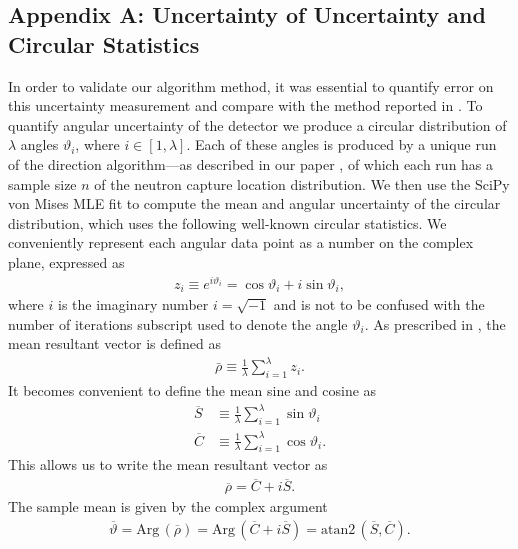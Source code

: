 \documentclass[tightenlines,twocolumn,prl,notitlepage,nofootinbib,preprintnumbers,longbibliography]{revtex4-1}
\begin{document}
\subsection{Appendix A: Uncertainty of Uncertainty and Circular Statistics}\label{app:uncert_of_uncert_and_circularstats}
%
In order to validate our algorithm method, it was essential to quantify error on this uncertainty measurement and compare with the method reported in \cite{Duvall_2022}. To quantify angular uncertainty of the detector we produce a circular distribution of $\lambda$ angles  $\vartheta_i$, where $i\in[1,\lambda]$. Each of these angles is produced by a unique run of the direction algorithm---as described in our paper \cite{10.1063/5.0315079}, of which each run has a sample size $n$ of the neutron capture location distribution. We then use the SciPy von Mises MLE fit to compute the mean and angular uncertainty of the circular distribution, which uses the following well-known circular statistics. We conveniently represent each angular data point as a number on the complex plane, expressed as
\begin{align}\label{eq:zdef}
z_i\equiv e^{i\vartheta_i}=\cos\vartheta_i+i\sin\vartheta_i,
\end{align}
where $i$ is the imaginary number $i=\sqrt{-1}$ and is not to be confused with the number of iterations subscript  used to denote the angle $\vartheta_i$.
As prescribed in \cite{Fisher_1993}, the mean resultant vector is defined as
\begin{align}
\bar \rho\equiv\frac{1}{\lambda}\sum_{i=1}^\lambda z_i.
\end{align}
It becomes convenient to define the mean sine and cosine as
\begin{subequations}
\begin{align}
\overline S &\equiv \frac{1}{\lambda}\sum_{i=1}^\lambda \sin\vartheta_i
\\
\overline{C} &\equiv \frac{1}{\lambda}\sum_{i=1}^\lambda \cos\vartheta_i.
\end{align}
\end{subequations}
This allows us to write the mean resultant vector as
\begin{align}
\overline \rho = \overline C + i\overline S.
\end{align}
The sample mean is given by the complex argument
\begin{align}
\overline \vartheta = \text{Arg}\,(\overline \rho)=\text{Arg}\,(\overline C + i\overline S)=\text{atan2}\,(\overline S, \overline C).
\end{align}
\end{document}
